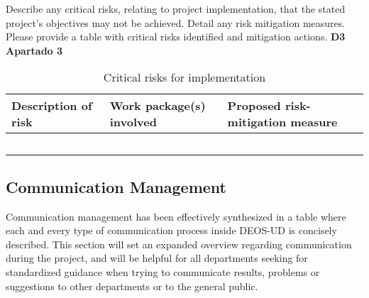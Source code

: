 Describe any critical risks, relating to project implementation, that the stated project’s objectives may not be achieved. Detail any risk mitigation measures. Please provide a table with critical risks identified and mitigation actions. \textbf{D3 Apartado 3}

\begin{longtable}[H]{p{4cm} p{4.7cm} p{5cm}}
	\toprule[2pt]
	
	\textbf{Description of risk} & \textbf{Work package(s) involved} & \textbf{Proposed risk-mitigation measure} \\
	
	\midrule[1.5pt] 
	\endhead
	
	 &  &  \vspace{0.2cm} \\
	
	\midrule

	 &  &  \vspace{0.2cm} \\
	
	\midrule
	
	 &  &   \vspace{0.2cm} \\

	\midrule

 	 &  &   \vspace{0.2cm} \\
	
	\bottomrule[2pt]
	
	\caption{Critical risks for implementation}
	\label{workpackages}
\end{longtable}

\subsection{Communication Management}

Communication management has been effectively synthesized in a table where each and every type of communication process inside DEOS-UD is concisely described. This section will set an expanded overview regarding communication during the project, and will be helpful for all departments seeking for standardized guidance when trying to communicate results, problems or suggestions to other departments or to the general public. 

